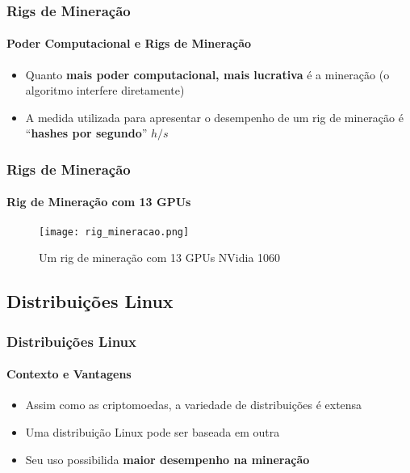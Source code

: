 \documentclass[aspectratio=43]{beamer}
\begin{document}
\begin{frame}
    \frametitle{Rigs de Mineração}
    \framesubtitle{Poder Computacional e Rigs de Mineração}

    \begin{itemize}
        \item Quanto \textbf{mais poder computacional, mais lucrativa} é a
            mineração (o algoritmo interfere diretamente)

        \item A medida utilizada para apresentar o desempenho de um
            rig de mineração é ``\textbf{hashes por segundo}'' $h/s$

    \end{itemize}
\end{frame}

\begin{frame}
    \frametitle{Rigs de Mineração}
    \framesubtitle{Rig de Mineração com 13 GPUs}

    \begin{figure}[H]
        \caption{\label{fig:rig_mineracao}Um rig de mineração com 13 GPUs
        NVidia 1060}
        \begin{center}
            \texttt{[image: rig\_mineracao.png]}
        \end{center}
    \end{figure}
\end{frame}

\subsection{Distribuições Linux}
\begin{frame}
    \frametitle{Distribuições Linux}
    \framesubtitle{Contexto e Vantagens}

    \begin{itemize}
        \item Assim como as criptomoedas, a variedade de distribuições
            é extensa

        \item Uma distribuição Linux pode ser baseada em outra

        \item Seu uso possibilida \textbf{maior desempenho na
            mineração}
    
    \end{itemize}
\end{frame}
\end{document}
